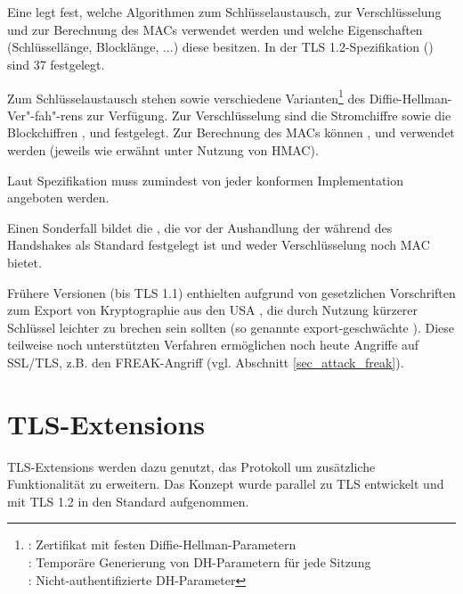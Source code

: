\section{\ciphersuites{}}
\label{sec_cipher_suites}

Eine \ciphersuite{} legt fest, welche Algorithmen zum Schlüsselaustausch, zur Verschlüsselung und zur Berechnung des MACs verwendet werden und welche Eigenschaften (Schlüssellänge, Blocklänge, ...) diese besitzen. In der TLS 1.2-Spezifikation (\cite{tls12}) sind 37 \ciphersuites{} festgelegt.

Zum Schlüsselaustausch stehen  sowie verschiedene Varianten\footnote{
	: Zertifikat mit festen Diffie-Hellman-Parametern\\ 
	: Temporäre Generierung von DH-Parametern für jede Sitzung \\
	:  Nicht-authentifizierte DH-Parameter
} des Diffie-Hellman-Ver"-fah"-rens zur Verfügung. 
Zur Verschlüsselung sind die Stromchiffre  sowie die Blockchiffren ,  und  festgelegt. 
Zur Berechnung des MACs können ,  und  verwendet werden (jeweils wie erwähnt unter Nutzung von HMAC).

Laut Spezifikation muss zumindest  von jeder konformen Implementation angeboten werden.

Einen Sonderfall bildet die \ciphersuite{} , die vor der Aushandlung der \ciphersuite{} während des Handshakes als Standard festgelegt ist und weder Verschlüsselung noch MAC bietet.

Frühere Versionen (bis TLS 1.1) enthielten aufgrund von gesetzlichen Vorschriften zum Export von Kryptographie aus den USA \ciphersuites{}, die durch Nutzung kürzerer Schlüssel leichter zu brechen sein sollten (so genannte export-geschwächte \ciphersuites{}). Diese teilweise noch unterstützten Verfahren ermöglichen noch heute Angriffe auf SSL/TLS, z.B. den FREAK-Angriff (vgl. Abschnitt \ref{sec_attack_freak}).

\section{TLS-Extensions}

\label{sec_tls_extensions}

TLS-Extensions werden dazu genutzt, das Protokoll um zusätzliche Funktionalität zu erweitern. Das Konzept wurde parallel zu TLS entwickelt und mit TLS 1.2 in den Standard aufgenommen.

